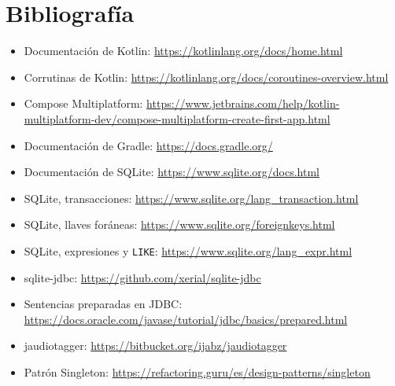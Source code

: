 \documentclass[12pt,letterpaper]{article}
\begin{document}
\section{Bibliografía}

\begin{itemize}
    \item Documentación de Kotlin: \url{https://kotlinlang.org/docs/home.html}
    \item Corrutinas de Kotlin: \url{https://kotlinlang.org/docs/coroutines-overview.html}
    \item Compose Multiplatform: \url{https://www.jetbrains.com/help/kotlin-multiplatform-dev/compose-multiplatform-create-first-app.html}
    \item Documentación de Gradle: \url{https://docs.gradle.org/}
    \item Documentación de SQLite: \url{https://www.sqlite.org/docs.html}
    \item SQLite, transacciones: \url{https://www.sqlite.org/lang_transaction.html}
    \item SQLite, llaves foráneas: \url{https://www.sqlite.org/foreignkeys.html}
    \item SQLite, expresiones y \texttt{LIKE}: \url{https://www.sqlite.org/lang_expr.html}
    \item sqlite-jdbc: \url{https://github.com/xerial/sqlite-jdbc}
    \item Sentencias preparadas en JDBC: \url{https://docs.oracle.com/javase/tutorial/jdbc/basics/prepared.html}
    \item jaudiotagger: \url{https://bitbucket.org/ijabz/jaudiotagger}
    \item Patrón Singleton: \url{https://refactoring.guru/es/design-patterns/singleton}
\end{itemize}
\end{document}
